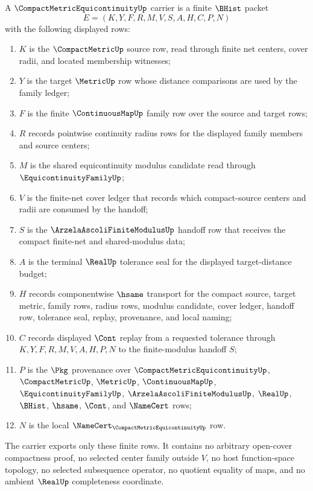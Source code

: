 \begin{definition}
\label{def:compact-metric-equicontinuity-carrier}
A $\CompactMetricEquicontinuityUp$ carrier is a finite $\BHist$ packet
$$
E=(K,Y,F,R,M,V,S,A,H,C,P,N)
$$
with the following displayed rows:
\begin{enumerate}
\item $K$ is the $\CompactMetricUp$ source row, read through finite net centers, cover radii, and located membership witnesses;
\item $Y$ is the target $\MetricUp$ row whose distance comparisons are used by the family ledger;
\item $F$ is the finite $\ContinuousMapUp$ family row over the source and target rows;
\item $R$ records pointwise continuity radius rows for the displayed family members and source centers;
\item $M$ is the shared equicontinuity modulus candidate read through $\EquicontinuityFamilyUp$;
\item $V$ is the finite-net cover ledger that records which compact-source centers and radii are consumed by the handoff;
\item $S$ is the $\ArzelaAscoliFiniteModulusUp$ handoff row that receives the compact finite-net and shared-modulus data;
\item $A$ is the terminal $\RealUp$ tolerance seal for the displayed target-distance budget;
\item $H$ records componentwise $\hsame$ transport for the compact source, target metric, family rows, radius rows, modulus candidate, cover ledger, handoff row, tolerance seal, replay, provenance, and local naming;
\item $C$ records displayed $\Cont$ replay from a requested tolerance through $K,Y,F,R,M,V,A,H,P,N$ to the finite-modulus handoff $S$;
\item $P$ is the $\Pkg$ provenance over $\CompactMetricEquicontinuityUp$, $\CompactMetricUp$, $\MetricUp$, $\ContinuousMapUp$, $\EquicontinuityFamilyUp$, $\ArzelaAscoliFiniteModulusUp$, $\RealUp$, $\BHist$, $\hsame$, $\Cont$, and $\NameCert$ rows;
\item $N$ is the local $\NameCert_{\CompactMetricEquicontinuityUp}$ row.
\end{enumerate}
The carrier exports only these finite rows. It contains no arbitrary open-cover compactness proof, no selected center family outside $V$, no host function-space topology, no selected subsequence operator, no quotient equality of maps, and no ambient $\RealUp$ completeness coordinate.
\end{definition}

